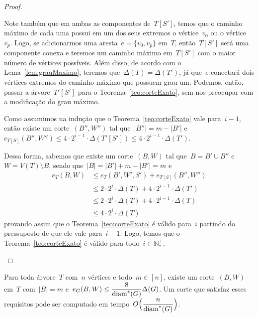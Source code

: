 \begin{proof}
\begin{itemize}
			Note também que em ambas as componentes de~$T[S']$, 
			temos que o caminho máximo de cada uma possui em um dos
			seus extremos o vértice~$v_0$ ou o vértice~$v_p$.
			Logo, se adicionarmos uma aresta~$e=\{v_0,v_p\}$ em~$T$,
			então~$T[S']$ será uma componente conexa e
			teremos um caminho máximo 
			em~$T[S']$ com o maior número de vértices possíveis.
			Além disso, de acordo com o Lema~\ref{lem:grauMaximo}, 
			teremos que~${\Delta(T) = \Delta(T')}$, já que~$e$ 
			conectará dois vértices extremos do caminho máximo
			que possuem grau um.
			Podemos, então, passar a árvore~$T'[S']$ para o 
			Teorema~\ref{teo:corteExato}, sem nos preocupar com a 
			modificação do grau máximo.
			
			Como assumimos na indução que o Teorema~\ref{teo:corteExato} vale
			para~${i-1}$, então existe um corte~$(B'',W'')$
			tal que~${|B''|=m-|B'|}$ 
			e~${e_{T[S]}(B'',W'')\le 4\cdot 2^{i-1}\cdot
			\Delta(T'[S'])\le 4\cdot 2^{i-1}\cdot\Delta(T')}$.

			Dessa forma, sabemos que existe um corte~$(B,W)$ tal
			que~${B=B'\cup B''}$ e~${W=V(T)\setminus B}$, sendo 
			que~${|B|=|B'| + m-|B'| = m}$ e
			\begin{align}
				e_T(B,W)&\le e_T(B',W',S') + e_{T[S]}(B'',W'') 
				\nonumber\\
				&\le 2\cdot2^i\cdot\Delta(T) + 4\cdot 2^{i-1}\cdot
				\Delta(T')\nonumber\\
				&\le 2\cdot2^i\cdot\Delta(T) + 4\cdot 2^{i-1}\cdot
				\Delta(T)\nonumber\\
				&\le 4\cdot 2^{i}\cdot\Delta(T) \nonumber
			\end{align}
			provando assim que o Teorema~\ref{teo:corteExato} é
			válido para~$i$ partindo do pressuposto de que ele vale
			para~${i-1}$. Logo, temos que o 
			Teorema~\ref{teo:corteExato} é válido para 
			todo~${i\in \mathbb{N^+_*}}$.
			
		\end{itemize}
	\end{proof}

	\bigskip
	\bigskip

	\begin{coro}
	\label{coro:corteExato}
		Para toda árvore~$T$ com~$n$ vértices e todo~${m\in[n]}$, existe
		um corte~$(B,W)$ em~$T$ com~${|B|=m}$ 
		e~${e_G(B,W)\le \dfrac{8}{\mathrm{diam}^*(G)}\Delta(G)}$.
		Um corte que satisfaz esses requisitos pode ser computado em 
		tempo~$O\Big(\dfrac{n}{\mathrm{diam}^*(G)}\Big)$.
	\end{coro}

